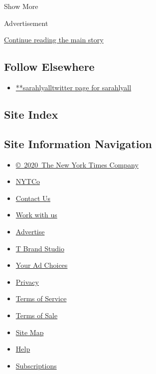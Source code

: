 Show More

Advertisement

\protect\hyperlink{after-mid2}{Continue reading the main story}

\hypertarget{follow-elsewhere}{%
\subsection{Follow Elsewhere}\label{follow-elsewhere}}

\begin{itemize}
\tightlist
\item
  \href{https://twitter.com/sarahlyall}{**sarahlyalltwitter page for
  sarahlyall}
\end{itemize}

\hypertarget{site-index}{%
\subsection{Site Index}\label{site-index}}

\hypertarget{site-information-navigation}{%
\subsection{Site Information
Navigation}\label{site-information-navigation}}

\begin{itemize}
\tightlist
\item
  \href{https://help.nytimes.com/hc/en-us/articles/115014792127-Copyright-notice}{©~2020~The
  New York Times Company}
\end{itemize}

\begin{itemize}
\tightlist
\item
  \href{https://www.nytco.com/}{NYTCo}
\item
  \href{https://help.nytimes.com/hc/en-us/articles/115015385887-Contact-Us}{Contact
  Us}
\item
  \href{https://www.nytco.com/careers/}{Work with us}
\item
  \href{https://nytmediakit.com/}{Advertise}
\item
  \href{http://www.tbrandstudio.com/}{T Brand Studio}
\item
  \href{https://www.nytimes.com/privacy/cookie-policy\#how-do-i-manage-trackers}{Your
  Ad Choices}
\item
  \href{https://www.nytimes.com/privacy}{Privacy}
\item
  \href{https://help.nytimes.com/hc/en-us/articles/115014893428-Terms-of-service}{Terms
  of Service}
\item
  \href{https://help.nytimes.com/hc/en-us/articles/115014893968-Terms-of-sale}{Terms
  of Sale}
\item
  \href{https://spiderbites.nytimes.com}{Site Map}
\item
  \href{https://help.nytimes.com/hc/en-us}{Help}
\item
  \href{https://www.nytimes.com/subscription?campaignId=37WXW}{Subscriptions}
\end{itemize}
